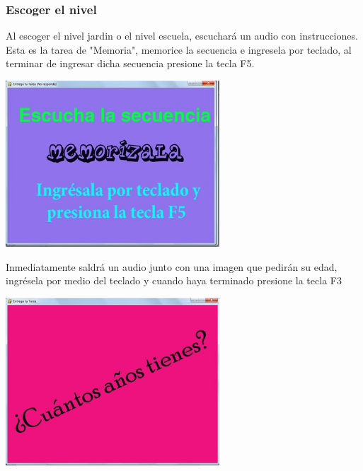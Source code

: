 \documentclass[12pt]{article}
\begin{document}
{{{\begin{flushleft}
\subsubsection{Escoger el nivel}
\vspace{0.1in}
Al escoger el nivel jardin o el nivel escuela, escuchará un audio con instrucciones. Esta es la tarea de "Memoria", memorice la secuencia e ingresela por teclado, al terminar de ingresar dicha secuencia presione la tecla F5.

	\begin{center}
		\begingroup
			\includegraphics[width=0.6\textwidth]{imagenes_usuario/memoriza}
		\endgroup
	\end{center}
\vspace{0.2in}
Inmediatamente saldrá un audio junto con una imagen que pedirán su edad, ingrésela por medio del teclado y cuando haya terminado presione la tecla F3

	\begin{center}
		\begingroup
			\includegraphics[width=0.6\textwidth]{imagenes_usuario/anios.jpg}
		\endgroup
	\end{center}

\end{flushleft}}}}
\end{document}
